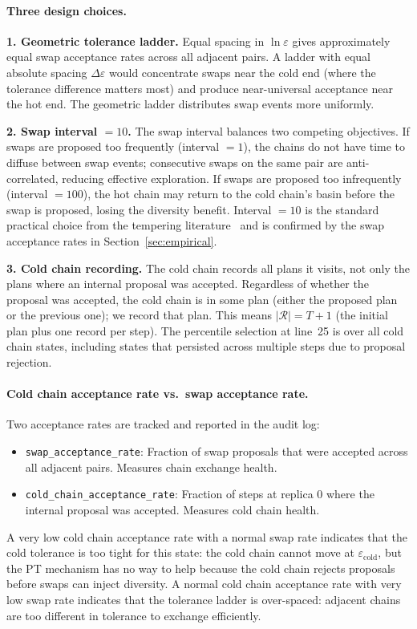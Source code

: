 \paragraph{Three design choices.}

\textbf{1. Geometric tolerance ladder.}
Equal spacing in $\ln\varepsilon$ gives approximately equal swap acceptance
rates across all adjacent pairs.
A ladder with equal absolute spacing $\Delta\varepsilon$ would concentrate swaps
near the cold end (where the tolerance difference matters most) and produce
near-universal acceptance near the hot end.
The geometric ladder distributes swap events more uniformly.

\textbf{2. Swap interval $= 10$.}
The swap interval balances two competing objectives.
If swaps are proposed too frequently (interval $= 1$), the chains do not have
time to diffuse between swap events; consecutive swaps on the same pair are
anti-correlated, reducing effective exploration.
If swaps are proposed too infrequently (interval $= 100$), the hot chain may
return to the cold chain's basin before the swap is proposed, losing the
diversity benefit.
Interval $= 10$ is the standard practical choice from the tempering
literature~\citep{earl2005} and is confirmed by the swap acceptance rates in
Section~\ref{sec:empirical}.

\textbf{3. Cold chain recording.}
The cold chain records all plans it visits, not only the plans where an
internal \fr{} proposal was accepted.
Regardless of whether the \fr{} proposal was accepted, the cold chain is in
some plan (either the proposed plan or the previous one); we record that plan.
This means $|\mathcal{R}| = T + 1$ (the initial plan plus one record per step).
The percentile selection at line~25 is over all cold chain states, including
states that persisted across multiple steps due to proposal rejection.

\paragraph{Cold chain acceptance rate vs.\ swap acceptance rate.}
Two acceptance rates are tracked and reported in the audit log:
\begin{itemize}
\item \texttt{swap\_acceptance\_rate}: Fraction of swap proposals that were
  accepted across all adjacent pairs. Measures chain exchange health.
\item \texttt{cold\_chain\_acceptance\_rate}: Fraction of \fr{} steps at replica
  0 where the internal proposal was accepted. Measures cold chain health.
\end{itemize}
A very low cold chain acceptance rate with a normal swap rate indicates that
the cold tolerance is too tight for this state: the cold chain cannot move
at $\varepsilon_{\mathrm{cold}}$, but the PT mechanism has no way to help
because the cold chain rejects proposals before swaps can inject diversity.
A normal cold chain acceptance rate with very low swap rate indicates that the
tolerance ladder is over-spaced: adjacent chains are too different in tolerance
to exchange efficiently.

